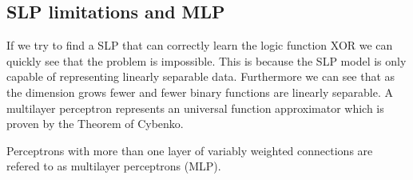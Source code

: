 \subsection{SLP limitations and MLP}
If we try to find a SLP that can correctly learn the logic function XOR we can quickly see that the problem is impossible. This is because the SLP model is only capable of representing linearly separable data. Furthermore we can see that as the dimension grows fewer and fewer binary functions are linearly separable.  A multilayer perceptron represents an universal function approximator which is proven by the Theorem of Cybenko. 
\begin{definition}
    Perceptrons with more than one layer of variably weighted connections are refered to as multilayer perceptrons (MLP).
\end{definition}
